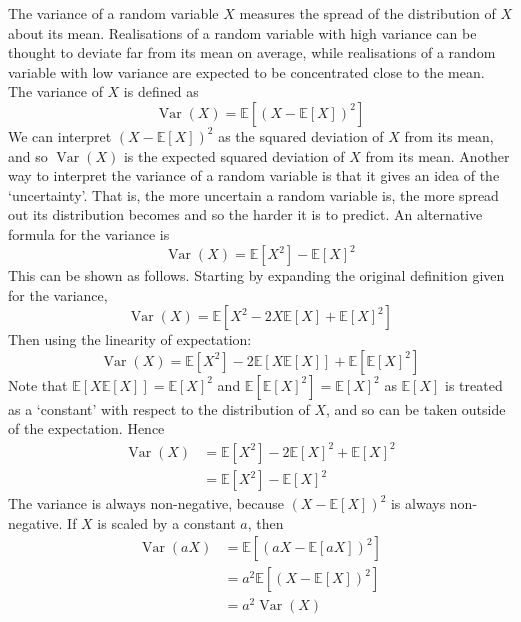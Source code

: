 \documentclass[11pt]{report} %
\begin{document}
The variance of a random variable $X$ measures the spread of the distribution of $X$ about its mean. Realisations of a random variable with high variance can be thought to deviate far from its mean on average, while realisations of a random variable with low variance are expected to be concentrated close to the mean. The variance of $X$ is defined as
\begin{equation}
\operatorname{Var}\left(X\right) = \mathbb{E}\left[\left(X - \mathbb{E}\left[X\right]\right)^{2}\right] 
\end{equation}
We can interpret $\left(X - \mathbb{E}\left[X\right]\right)^{2}$ as the squared deviation of $X$ from its mean, and so $\operatorname{Var}\left(X\right)$ is the expected squared deviation of $X$ from its mean. Another way to interpret the variance of a random variable is that it gives an idea of the `uncertainty'. That is, the more uncertain a random variable is, the more spread out its distribution becomes and so the harder it is to predict. An alternative formula for the variance is
\begin{equation}
\operatorname{Var}\left(X\right) = \mathbb{E}\left[X^{2}\right] - \mathbb{E}\left[X\right]^{2}
\end{equation}
This can be shown as follows. Starting by expanding the original definition given for the variance,
\begin{equation}
\operatorname{Var}\left(X\right) = \mathbb{E}\left[X^{2} - 2X\mathbb{E}\left[X\right] + \mathbb{E}\left[X\right]^{2}\right] 
\end{equation}
Then using the linearity of expectation:
\begin{equation}
\operatorname{Var}\left(X\right) = \mathbb{E}\left[X^{2}\right] - 2\mathbb{E}\left[X\mathbb{E}\left[X\right]\right] + \mathbb{E}\left[\mathbb{E}\left[X\right]^{2}\right] 
\end{equation}
Note that $\mathbb{E}\left[X\mathbb{E}\left[X\right]\right] = \mathbb{E}\left[X\right]^{2}$ and $\mathbb{E}\left[\mathbb{E}\left[X\right]^{2}\right] = \mathbb{E}\left[X\right]^{2}$ as $\mathbb{E}\left[X\right]$ is treated as a `constant' with respect to the distribution of $X$, and so can be taken outside of the expectation. Hence
\begin{align}
\operatorname{Var}\left(X\right) &= \mathbb{E}\left[X^{2}\right] - 2\mathbb{E}\left[X\right]^{2} + \mathbb{E}\left[X\right]^{2} \\
&= \mathbb{E}\left[X^{2}\right] - \mathbb{E}\left[X\right]^{2}
\end{align}
The variance is always non-negative, because $\left(X - \mathbb{E}\left[X\right]\right)^{2}$ is always non-negative. If $X$ is scaled by a constant $a$, then
\begin{align}
\operatorname{Var}\left(aX\right) &= \mathbb{E}\left[\left(aX - \mathbb{E}\left[aX\right]\right)^{2}\right] \\
&= a^{2}\mathbb{E}\left[\left(X - \mathbb{E}\left[X\right]\right)^{2}\right] \\
&= a^{2}\operatorname{Var}\left(X\right)
\end{align}
\end{document}
